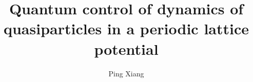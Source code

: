\documentclass[fogscopy,onehalfspacing,11pt]{ubcdiss}
\title{Quantum control of dynamics of quasiparticles in a periodic lattice potential}
\author{Ping Xiang}
\begin{document}

\maketitle


\cleardoublepage


\cleardoublepage



\tableofcontents
\cleardoublepage	%

\listoftables
\cleardoublepage	%

\listoffigures
\cleardoublepage	%



\textspacing		%






\mainmatter

\acresetall	%











%
%
%
%
%
\end{document}
